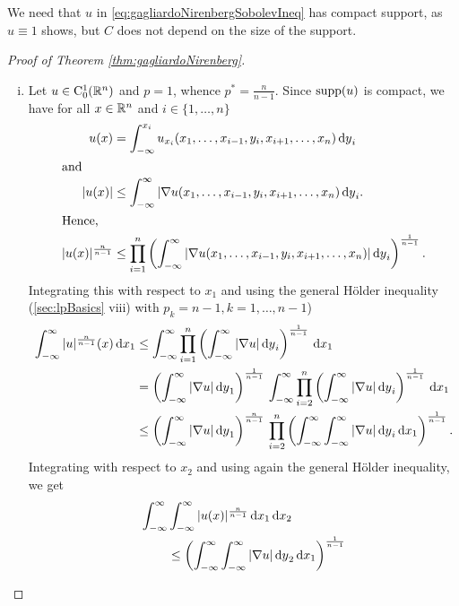 \begin{rem}
  We need that $u$ in \eqref{eq:gagliardoNirenbergSobolevIneq} has compact support, as $u \equiv 1$ shows, but $C$ does not depend on the size of the support.
\end{rem}

\begin{proof}[Proof of Theorem \ref{thm:gagliardoNirenberg}]
  \begin{enumerate}[i)]
    \item Let $u \in \mathrm{C}_0^1(\mathbb{R}^n)$ and $p = 1$, whence $p^* = \frac{n}{n - 1}$.
      Since $\operatorname{supp}(u)$ is compact, we have for all $x \in \mathbb{R}^n$ and $i \in \{1,\dots,n\}$
      \begin{align*}
        u(x) &= \int_{-\infty}^{x_i} u_{x_i}(x_1,\dots,x_{i - 1}, y_i, x_{i + 1}, \dots, x_n) \, {\operatorname{d}\!{y}}_i \\
        \intertext{and}
        |u(x)| &\leq \int_{-\infty}^\infty |\nabla u(x_1,\dots,x_{i - 1}, y_i, x_{i + 1}, \dots,x_n) \, {\operatorname{d}\!{y}}_i. \\
        \intertext{Hence,}
        |u(x)|^{\frac{n}{n - 1}} &\leq \prod_{i = 1}^n \left( \int_{-\infty}^\infty |\nabla u(x_1,\dots,x_{i - 1}, y_i, x_{i + 1}, \dots, x_n) | \, {\operatorname{d}\!{y}}_i \right)^{\frac{1}{n - 1}}.
      \end{align*}
      Integrating this with respect to $x_1$ and using the general Hölder inequality (\ref{sec:lpBasics} viii) with $p_k = n - 1, k = 1,\dots,n - 1$)
      \begin{align*}
        \int_{-\infty}^\infty |u|^{\frac{n}{n - 1}}(x) \d x_1
        &\leq \int_{-\infty}^\infty \prod_{i = 1}^n \left( \int_{-\infty}^\infty |\nabla u| \d y_i \right)^{\frac{1}{n - 1}} \d x_1 \\
        &= \left( \int_{-\infty}^\infty |\nabla u| \d y_1 \right)^{\frac{1}{n - 1}} \, \int_{-\infty}^\infty \prod_{i = 2}^n \left( \int_{-\infty}^\infty |\nabla u| \d y_i \right)^{\frac{1}{n - 1}} \d x_1 \\
        &\leq \left( \int_{-\infty}^\infty |\nabla u| \d y_1 \right)^{\frac{n}{n - 1}} \, \prod_{i = 2}^n \left( \int_{-\infty}^\infty \int_{-\infty}^\infty |\nabla u| \d y_i \d x_1 \right)^{\frac{1}{n - 1}}.
      \end{align*}
      Integrating with respect to $x_2$ and using again the general Hölder inequality, we get
      \begin{align*}
        \int_{-\infty}^\infty &\int_{-\infty}^\infty |u(x)|^{\frac{n}{n - 1}} \d x_1 \d x_2 \\
        &\leq \left( \int_{-\infty}^\infty \int_{-\infty}^\infty |\nabla u| \d y_2 \d x_1 \right)^{\frac{1}{n - 1}} \\

\end{align*}
\end{enumerate}
\end{proof}
